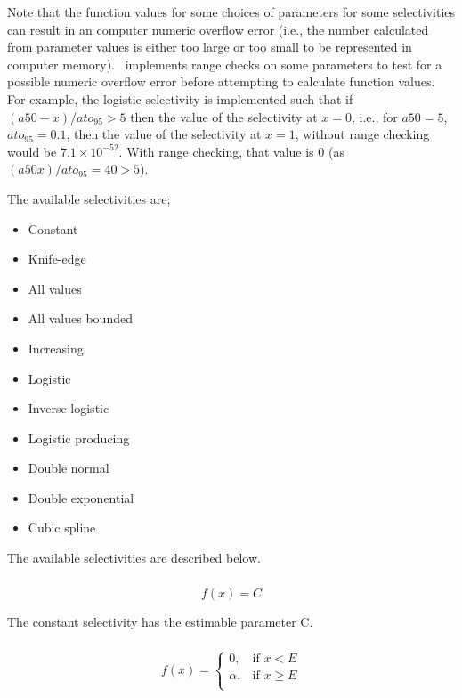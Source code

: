 Note that the function values for some choices of parameters for some selectivities can result in an computer numeric overflow error (i.e., the number calculated from parameter values is either too large or too small to be represented in computer memory). \iSAM\ implements range checks on some parameters to test for a possible numeric overflow error before attempting to calculate function values. For example, the logistic selectivity is implemented such that if $(a50-x)/ato_95 > 5$ then the value of the selectivity at $x=0$, i.e., for $a50=5$, $ato_95=0.1$, then the value of the selectivity at $x=1$, without range checking would be $7.1 \times 10^{-52}$. With range checking, that value is $0$ (as $(a50 x)/ato_95=40 > 5$).

The available selectivities are;

\begin{itemize}
  \item Constant
  \item Knife-edge
  \item All values
  \item All values bounded
  \item Increasing
  \item Logistic
	\item Inverse logistic
  \item Logistic producing
  \item Double normal
  \item Double exponential
	\item Cubic spline
\end{itemize}

The available selectivities are described below.

\subsubsection[Constant]{}

\begin{equation}
f(x)=C
\end{equation}

The constant selectivity has the estimable parameter C. 

\subsubsection[Knife-edge]{}

\begin{equation}
f(x)= \begin{cases}
  0, & \text{if $x < E$} \\
  \alpha, & \text{if $x \ge E$}\\ 
  \end{cases} 
\end{equation}


